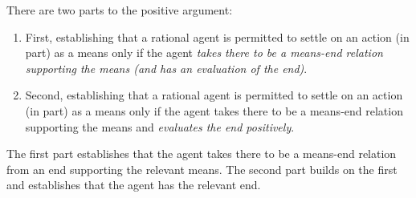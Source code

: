 \documentclass[10pt]{article}
\begin{document}




There are two parts to the positive argument:

\begin{enumerate}[label=\arabic*., ref=(\arabic*)]
\item First, establishing that a rational agent is permitted to settle on an action (in part) as a means only if the agent \emph{takes there to be a means-end relation supporting the means (and has an evaluation of the end)}.
\item Second, establishing that a rational agent is permitted to settle on an action (in part) as a means only if the agent takes there to be a means-end relation supporting the means and \emph{evaluates the end positively}.
\end{enumerate}
The first part establishes that the agent takes there to be a means-end relation from an end supporting the relevant means.
The second part builds on the first and establishes that the agent has the relevant end.
\end{document}
